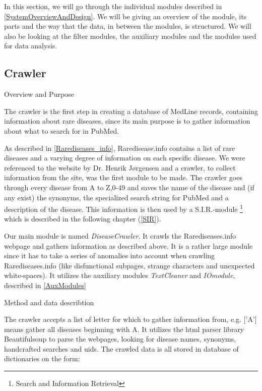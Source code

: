 In this section, we will go through the individual modules described
in \ref{SystemOverviewAndDesign}. We will be giving an
overview of the module, its parts and the way that the data, in
between the modules, is structured. We will also be looking at the
filter modules, the auxiliary modules and the modules used for data
analysis.

\subsection{Crawler\label{Crawler}}

Overview and Purpose

The crawler is the first step in creating a database of MedLine
records, containing information about rare diseases, since its main
purpose is to gather information about what to search for in PubMed.

As described in \ref{Rarediseases_info}, Raredisease.info contains a
list of rare diseases and a varying degree of information on each
specific disease. We were referenced to the website by Dr. Henrik
Jørgensen  and a crawler, to collect
information from the site, was the first module to be made. The
crawler goes through every disease from A to Z,0-49 and saves the name
of the disease and (if any exist) the synonyms, the specialized search
string for PubMed and a description of the disease. This information
is then used by a S.I.R.-module \footnote{Search and Information
  Retrieval} which is described in the following chapter (\ref{SIR}).

Our main module is named \textit{DiseaseCrawler}. It crawls the Rarediseases.info webpage and gathers information as described above. It is a rather large module since it has to take a series of anomalies into account when crawling Rarediseases.info (like disfunctional subpages, strange characters and unexpected white-spaces). It utilizes the auxiliary modules \textit{TextCleaner} and \textit{IOmodule}, described in \ref{AuxModules}

Method and data describtion

The crawler accepts a list of letter for which to gather information from, e.g. ['A'] means gather all diseases beginning with A. It utilizes the html parser library Beautifulsoup  to parse the webpages, looking for disease names, synonyms, handcrafted searches and uids. The crawled data is all stored in database of dictionaries on the form:

